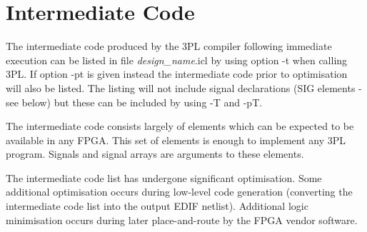 \pagebreak

\chapter{Intermediate Code}\label{intermediatecode}

    The intermediate code produced by the 3PL compiler following immediate
    execution can be listed in file {\em design\_name}.icl by using option -t
    when calling 3PL. If option -pt is given instead the intermediate code
    prior to optimisation will also be listed. The listing will not include
    signal declarations (SIG elements - see below) but these can be included
    by using -T and -pT.

    The intermediate code consists largely of elements which can be
    expected to be available in any FPGA. This set of elements is enough
    to implement any 3PL program. Signals and signal arrays are arguments
    to these elements.
    
    The intermediate code list has undergone significant optimisation. Some
    additional optimisation occurs during low-level code generation
    (converting the intermediate code list into the output EDIF netlist).
    Additional logic minimisation occurs during later place-and-route by the
    FPGA vendor software.
    
